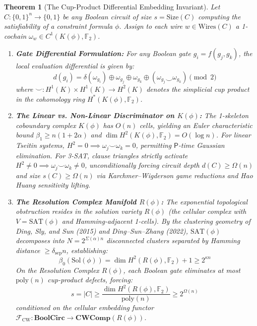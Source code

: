 \documentclass[11pt,a4paper]{article}
\newtheorem{theorem}{Theorem}[section]
\theoremstyle{definition}
\theoremstyle{remark}
\newcommand{\PP}{\mathsf{P}}
\newcommand{\poly}{\mathrm{poly}}
\begin{document}
\begin{theorem}[The Cup-Product Differential Embedding Invariant]\label{thm:cup_product_embedding}
Let $C: \{0,1\}^n \to \{0,1\}$ be any Boolean circuit of size $s = \mathrm{Size}(C)$ computing the satisfiability of a constraint formula $\phi$. 
Assign to each wire $w \in \mathrm{Wires}(C)$ a 1-cochain $\omega_w \in C^1(K(\phi), \mathbb{F}_2)$.
\begin{enumerate}
    \item \textbf{Gate Differential Formulation:} For any Boolean gate $g_i = f(g_j, g_k)$, the local evaluation differential is given by:
    \[
    d(g_i) = \delta(\omega_{g_i}) \oplus \omega_{g_j} \oplus \omega_{g_k} \oplus (\omega_{g_j} \smile \omega_{g_k}) \pmod 2
    \]
    where $\smile: H^1(K) \times H^1(K) \to H^2(K)$ denotes the simplicial cup product in the cohomology ring $H^*(K(\phi), \mathbb{F}_2)$.
    
    \item \textbf{The Linear vs. Non-Linear Discriminator on $K(\phi)$:} The 1-skeleton coboundary complex $K(\phi)$ has $O(n)$ cells, yielding an Euler characteristic bound $\beta_1 \ge n(1 + 2\alpha)$ and $\dim H^2(K(\phi), \mathbb{F}_2) = O(\log n)$. For linear Tseitin systems, $H^2 = 0 \implies \omega_j \smile \omega_k = 0$, permitting $\PP$-time Gaussian elimination. For 3-SAT, clause triangles strictly activate $H^2 \neq 0 \implies \omega_j \smile \omega_k \neq 0$, unconditionally forcing circuit depth $d(C) \ge \Omega(n)$ and size $s(C) \ge \Omega(n)$ via Karchmer--Wigderson game reductions and Hao Huang sensitivity lifting.

    \item \textbf{The Resolution Complex Manifold $R(\phi)$:} The exponential topological obstruction resides in the solution variety $R(\phi)$ (the cellular complex with $V = \mathrm{SAT}(\phi)$ and Hamming-adjacent 1-cells). By the clustering geometry of Ding, Sly, and Sun (2015) and Ding--Sun--Zhang (2022), $\mathrm{SAT}(\phi)$ decomposes into $N = 2^{\Sigma(\alpha)n}$ disconnected clusters separated by Hamming distance $\ge \delta_{\mathrm{sep}} n$, establishing:
    \[
    \beta_0(\mathrm{Sol}(\phi)) = \dim H^2(R(\phi), \mathbb{F}_2) + 1 \ge 2^{\kappa n}
    \]
    On the Resolution Complex $R(\phi)$, each Boolean gate eliminates at most $\poly(n)$ cup-product defects, forcing:
    \[
    s = |C| \ge \frac{\dim H^2(R(\phi), \mathbb{F}_2)}{\poly(n)} \ge 2^{\Omega(n)}
    \]
    conditioned on the cellular embedding functor $\mathcal{F}_{\mathrm{CW}}: \mathbf{BoolCirc} \to \mathbf{CWComp}(R(\phi))$.
\end{enumerate}
\end{theorem}
\end{document}
